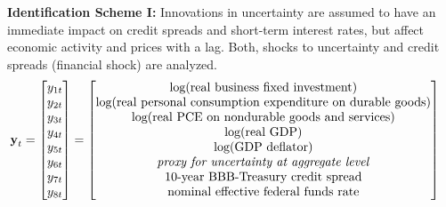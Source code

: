 \documentclass[a4paper,11pt,listof=nochaptergap,oneside,pointednumbers,bibtotoc,bigheadings,liststotoc,hidelinks]{scrbook}
\theoremstyle{mysatz}
\theoremstyle{mydefinition}
\theoremstyle{mytheorem}
\theoremstyle{mybemerkung}
\newcommand{\vect}[1]{\boldsymbol{\mathbf{#1}}}
\begin{document}
\textbf{Identification Scheme I:}
Innovations in uncertainty are assumed to have an immediate impact on credit spreads and short-term interest rates, but affect economic activity and prices with a lag. Both, shocks to uncertainty and credit spreads (financial shock) are analyzed.
\begin{equation} \label{eq:VAR20}
\begin{split}
\vect{y}_t & = 
 \begin{bmatrix} 
 		y_{1t} \\
		y_{2t} \\
		y_{3t} \\
		y_{4t} \\
		y_{5t} \\
		y_{6t} \\
		y_{7t} \\
		y_{8t} 
	      \end{bmatrix} = 	      
	      \begin{bmatrix} \text{log(real business fixed investment)} \\ 
				      \text{log(real personal consumption expenditure on durable goods)}\\ 
				      \text{log(real PCE on nondurable goods and services)}\\
				      \text{log(real GDP)}\\ 
				      \text{log(GDP deflator)}\\
				      \text{\textit{proxy for uncertainty at aggregate level}}\\
				      \text{10-year BBB-Treasury credit spread}\\
				      \text{nominal effective federal funds rate}
	      \end{bmatrix}
\end{split}
\end{equation}	
\end{document}
